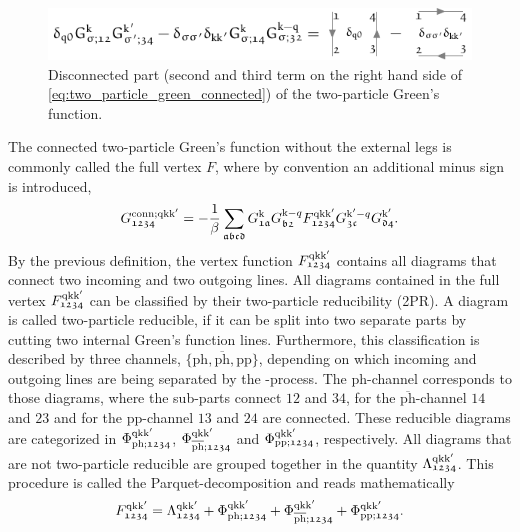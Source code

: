 \documentclass[../../main.tex]{subfiles}
\begin{document}
\begin{figure}[ht!]
	\centering
	\includegraphics[scale=1.2]{../../Graphics/Diagrams/two_particle_green_disconnected/two_particle_green_disconnected}
	\caption{Disconnected part (second and third term on the right hand side of \eqref{eq:two_particle_green_connected}) of the two-particle Green's function.}
	\label{fig:two_particle_green_disconnected}
\end{figure}
The connected two-particle Green's function without the external legs is commonly called the full vertex $F$, where by convention an additional minus sign is introduced,
\begin{align}
	G_{\mathfrak{1234}}^{\text{conn};\text{q}\text{k}\text{k}'} = -\frac1\beta \sum_{\mathfrak{abcd}} G_{\mathfrak{1a}}^{\text{k}} G_{\mathfrak{b2}}^{\text{k}-q} F_{\mathfrak{1234}}^{\text{q}\text{k}\text{k}'} G_{\mathfrak{3c}}^{\text{k}'-q} G_{\mathfrak{d4}}^{\text{k}'}.
\end{align}
By the previous definition, the vertex function $F_{\mathfrak{1234}}^{\text{q}\text{k}\text{k}'}$ contains all diagrams that connect two incoming and two outgoing lines. All diagrams contained in the full vertex $F_{\mathfrak{1234}}^{\text{q}\text{k}\text{k}'}$ can be classified by their two-particle reducibility (2PR). A diagram is called two-particle reducible, if it can be split into two separate parts by cutting two internal Green's function lines. Furthermore, this classification is described by three channels, $\{\text{ph},\overline{\text{ph}},\text{pp}\}$, depending on which incoming and outgoing lines are being separated by the -process. The $\text{ph}$-channel corresponds to those diagrams, where the sub-parts connect $\mathfrak{12}$ and $\mathfrak{34}$, for the $\overline{\text{ph}}$-channel $\mathfrak{14}$ and $\mathfrak{23}$ and for the $\text{pp}$-channel $\mathfrak{13}$ and $\mathfrak{24}$ are connected. These reducible diagrams are categorized in $\Phi_{\text{ph};\mathfrak{1234}}^{\text{q}\text{k}\text{k}'}$, $\Phi_{\overline{\text{ph}};\mathfrak{1234}}^{\text{q}\text{k}\text{k}'}$ and $\Phi_{\text{pp};\mathfrak{1234}}^{\text{q}\text{k}\text{k}'}$, respectively. All diagrams that are not two-particle reducible are grouped together in the quantity $\Lambda_{\mathfrak{1234}}^{\text{q}\text{k}\text{k}'}$. This procedure is called the Parquet-decomposition and reads mathematically
\begin{align}\label{eq:parquet_decomposition}
	F_{\mathfrak{1234}}^{\text{q}\text{k}\text{k}'}=\Lambda_{\mathfrak{1234}}^{\text{q}\text{k}\text{k}'}+\Phi_{\text{ph};\mathfrak{1234}}^{\text{q}\text{k}\text{k}'}+\Phi_{\overline{\text{ph}};\mathfrak{1234}}^{\text{q}\text{k}\text{k}'}+\Phi_{\text{pp};\mathfrak{1234}}^{\text{q}\text{k}\text{k}'}.
\end{align}
\end{document}
